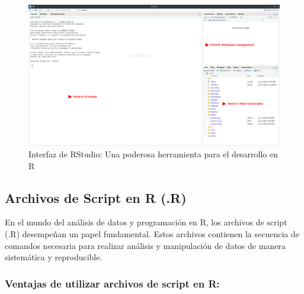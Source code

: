 \documentclass[
  a4paper,
]{article}
\begin{document}
\begin{figure}

\caption{Interfaz de RStudio: Una poderosa herramienta para el
desarrollo en R}

{\centering \includegraphics{images/Screenshot_20230610_233058.png}

}

\end{figure}

\hypertarget{archivos-de-script-en-r-.r}{%
\subsection{Archivos de Script en R
(.R)}\label{archivos-de-script-en-r-.r}}

En el mundo del análisis de datos y programación en R, los archivos de
script (.R) desempeñan un papel fundamental. Estos archivos contienen la
secuencia de comandos necesaria para realizar análisis y manipulación de
datos de manera sistemática y reproducible.

\hypertarget{ventajas-de-utilizar-archivos-de-script-en-r}{%
\subsubsection{Ventajas de utilizar archivos de script en
R:}\label{ventajas-de-utilizar-archivos-de-script-en-r}}
\end{document}
